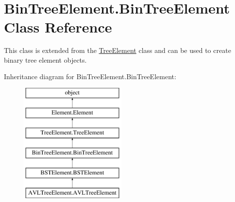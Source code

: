 \hypertarget{class_bin_tree_element_1_1_bin_tree_element}{}\section{Bin\+Tree\+Element.\+Bin\+Tree\+Element Class Reference}
\label{class_bin_tree_element_1_1_bin_tree_element}


This class is extended from the \hyperlink{namespace_tree_element}{Tree\+Element} class and can be used to create binary tree element objects.  


Inheritance diagram for Bin\+Tree\+Element.\+Bin\+Tree\+Element\+:\begin{figure}[H]
\begin{center}
\leavevmode
\includegraphics[height=6.000000cm]{class_bin_tree_element_1_1_bin_tree_element}
\end{center}
\end{figure}
